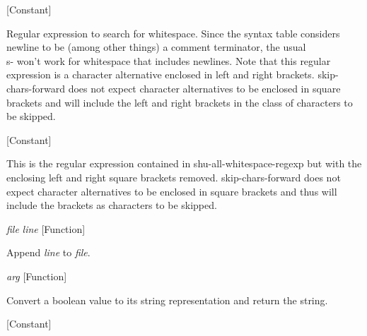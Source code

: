 \vspace{1em}
\noindent
{}
\usebox{\funcname}
 \hfill [Constant]

\begin{doc-string}
Regular expression to search for whitespace.  Since the syntax table considers
newline to be (among other things) a comment terminator, the usual \\s- won't work
for whitespace that includes newlines.  Note that this regular expression is a
character alternative enclosed in left and right brackets.  skip-chars-forward does
not expect character alternatives to be enclosed in square brackets and will include
the left and right brackets in the class of characters to be skipped.
\end{doc-string}

\vspace{1em}
\noindent
{}
\usebox{\funcname}
 \hfill [Constant]

\begin{doc-string}
This is the regular expression contained in shu-all-whitespace-regexp but with
the enclosing left and right square brackets removed.  skip-chars-forward does
not expect character alternatives to be enclosed in square brackets and thus
will include the brackets as characters to be skipped.
\end{doc-string}

\vspace{1em}
\noindent
{}
\usebox{\funcname}\emph{file} \emph{line}
 \hfill [Function]

\begin{doc-string}
Append \emph{line} to \emph{file}.
\end{doc-string}

\vspace{1em}
\noindent
{}
\usebox{\funcname}\emph{arg}
 \hfill [Function]

\begin{doc-string}
Convert a boolean value to its string representation and return the string.
\end{doc-string}

\vspace{1em}
\noindent
{}
\usebox{\funcname}
 \hfill [Constant]

